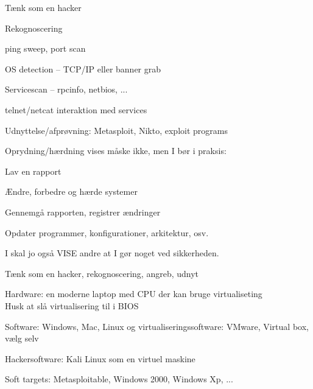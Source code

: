 \documentclass[20pt,landscape,a4paper,footrule]{foils}
\begin{document}

\begin{list1}
\item Tænk som en hacker
\item Rekognoscering
\begin{list2}
\item ping sweep, port scan
\item OS detection -- TCP/IP eller banner grab
\item Servicescan -- rpcinfo, netbios, ...
\item telnet/netcat interaktion med services
\end{list2}
\item Udnyttelse/afprøvning: Metasploit, Nikto, exploit programs
\item Oprydning/hærdning vises måske ikke, men I bør i praksis:
\begin{list2}
\item Lav en rapport
\item Ændre, forbedre og hærde systemer
\item Gennemgå rapporten, registrer ændringer
\item Opdater programmer, konfigurationer, arkitektur, osv.
\end{list2}
\item I skal jo også VISE andre at I gør noget ved sikkerheden.
\end{list1}



\begin{list2}
\item Tænk som en hacker, rekognoscering, angreb, udnyt
\item Hardware: en moderne laptop med CPU der kan bruge virtualiseting\\
Husk at slå virtualisering til i BIOS
\item Software: Windows, Mac, Linux og virtualiseringssoftware: VMware, Virtual box, vælg selv
\item Hackersoftware: Kali Linux som en virtuel maskine
\item Soft targets: Metasploitable, Windows 2000, Windows Xp, ...
\end{list2}


\end{document}
